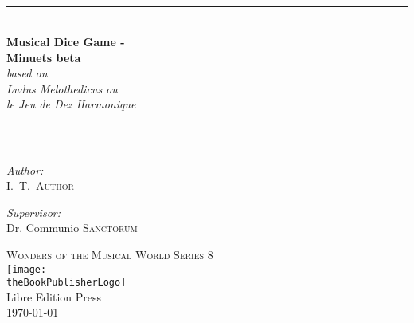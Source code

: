 \documentclass[a4paper,x11names,svgnames,10pt]{article}
\title{\textsc{\mdgBookTitle}}
\author{\textsc{\authorFirstMidNameInit \authorLastName}}
\date{\textsc{\dateGenerated}}
\def\authorFirstMidNameInit{I.\ T.\ }
\def\authorLastName{Author}
\def\dateGenerated{\today}
\def\volNumber{beta}
\def\mdgBookTitle{Musical Dice Game - \\[0.15cm] Minuets \volNumber}
\def\mdgBookSubTitle{{\small based on}\\ Ludus Melothedicus ou \\[0.15cm] le Jeu de Dez Harmonique  }
\def\theBookSeries{Wonders of the Musical World Series 8}
\def\theBookPublisher{Libre Edition Press}
\def\theBookPublisherLogo{../images/1ed.png}
\newcommand{\HRule}{\rule{\linewidth}{0.5mm}}
\begin{document}


\newpage
{
${}_{}$\\
\vspace{1.00in}	
\thispagestyle{empty}
\begin{center}
	\HRule \\[0.4cm]
	{\huge \bfseries \mdgBookTitle} \\[0.2cm]
	{\large{\em \mdgBookSubTitle} }\\[0.2cm]
	\HRule \\[1.5cm]
	\begin{minipage}{0.4\textwidth}
		\begin{flushleft} \large
			\emph{Author:}\\
			\authorFirstMidNameInit \textsc{\authorLastName}
		\end{flushleft}
	\end{minipage}
	\begin{minipage}{0.4\textwidth}
		\begin{flushright} \large
			\emph{Supervisor:} \\
			Dr. Communio \textsc{Sanctorum}
		\end{flushright}
	\end{minipage}
	\vfill
	{\textsc{\Large \theBookSeries}}  \\[0.2cm] 
	\texttt{[image: \\theBookPublisherLogo]}\\ 
	{\large \theBookPublisher \\
       \dateGenerated }\\
	\vspace{2.50in}
\end{center}
\newpage


\tableofcontents\label{tabofcon}


\baselineskip 14pt

\newpage
}
\end{document}

